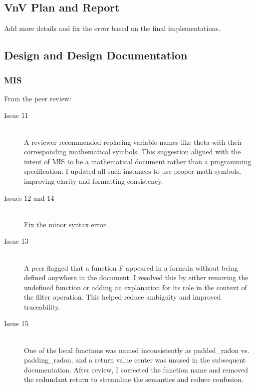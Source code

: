 \documentclass{article}
\begin{document}
\subsection{VnV Plan and Report}
Add more details and fix the error based on the final implementations.

\subsection{Design and Design Documentation}
\subsubsection{MIS}
From the peer review:
\begin{description}
\item[Issue 11] \hfill \\
  A reviewer recommended replacing variable names like theta with their
  corresponding mathematical symbols. This suggestion aligned with the intent
  of MIS to be a mathematical document rather than a programming specification.
  I updated all such instances to use proper math symbols, improving clarity and
  formatting consistency.
\item[Issues 12 and 14] \hfill \\
  Fix the minor syntax error.
\item[Issue 13] \hfill \\
  A peer flagged that a function F appeared in a formula without being defined
  anywhere in the document. I resolved this by either removing the undefined
  function or adding an explanation for its role in the context of the filter
  operation. This helped reduce ambiguity and improved traceability.
\item[Issue 15] \hfill \\
  One of the local functions was named inconsistently as padded\_radon vs.
  padding\_radon, and a return value center was unused in the subsequent
  documentation. After review, I corrected the function name and removed the
  redundant return to streamline the semantics and reduce confusion.
\end{description}
\end{document}
